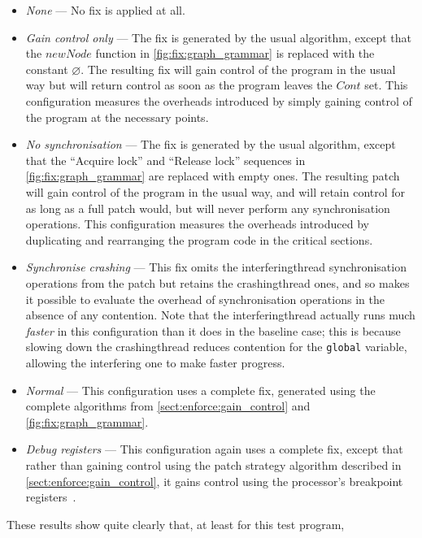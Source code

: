 \begin{itemize}
\item \textit{None} --- No fix is applied at all.
\item \textit{Gain control only} --- The fix is generated by the usual
  algorithm, except that the $\mathit{newNode}$ function in
  \autoref{fig:fix:graph_grammar} is replaced with the constant
  $\varnothing$.  The resulting fix will gain control of the program
  in the usual way but will return control as soon as the program
  leaves the $\mathit{Cont}$ set.  This configuration measures the
  overheads introduced by simply gaining control of the program at the
  necessary points.
\item \textit{No synchronisation} --- The fix is generated by the
  usual algorithm, except that the ``Acquire lock'' and ``Release
  lock'' sequences in \autoref{fig:fix:graph_grammar} are replaced
  with empty ones.  The resulting patch will gain control of the
  program in the usual way, and will retain control for as long as a
  full patch would, but will never perform any synchronisation
  operations.  This configuration measures the overheads introduced by
  duplicating and rearranging the program code in the critical
  sections.
\item \textit{Synchronise crashing} --- This fix omits the
  \gls{interferingthread} synchronisation operations from the patch
  but retains the \gls{crashingthread} ones, and so makes it possible
  to evaluate the overhead of synchronisation operations in the
  absence of any contention.  Note that the \gls{interferingthread}
  actually runs much \emph{faster} in this configuration than it does
  in the baseline case; this is because slowing down the
  \gls{crashingthread} reduces contention for the \texttt{global}
  variable, allowing the interfering one to make faster progress.
\item \textit{Normal} --- This configuration uses a complete fix,
  generated using the complete algorithms from
  \autoref{sect:enforce:gain_control} and
  \autoref{fig:fix:graph_grammar}.
\item \textit{Debug registers} --- This configuration again uses a
  complete fix, except that rather than gaining control using the
  patch strategy algorithm described in
  \autoref{sect:enforce:gain_control}, it gains control using the
  processor's breakpoint registers~\cite[Chapter 16.2: Debug
    Registers]{Intel2009}.
\end{itemize}
These results show quite clearly that, at least for this test program,
